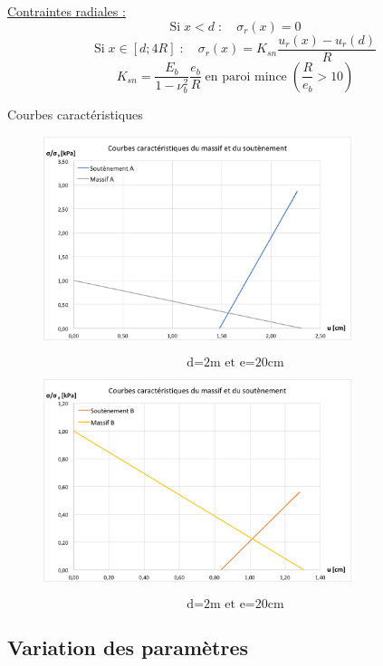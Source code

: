 \documentclass{beamer}
\begin{document}
\begin{frame}
\underline{Contraintes radiales :}\\
\[\text{Si}\;x<d\;:\quad \sigma_r(x)=0\]
\[\text{Si}\;x\in[d;4R]\;:\quad \sigma_r(x)=K_{sn}\dfrac{u_r(x)-u_r(d)}{R}\]
\[K_{sn}=\dfrac{E_b}{1-\nu_b^2}\dfrac{e_b}{R}\;\text{en paroi mince}\;\left(\dfrac{R}{e_b}>10\right)\]
    
    
\end{frame}

\begin{frame}{Courbes caractéristiques}
    
\begin{figure}
\centering
\includegraphics[width=9cm]{sig_u_A.png}
\end{figure}
\[\text{d=2m et e=20cm}\]
\end{frame}


\begin{frame}

\begin{figure}
\centering
\includegraphics[width=9cm]{sig_u_B.png}
\end{figure}
\[\text{d=2m et e=20cm}\]

\end{frame}

\subsection{Variation des paramètres}
\end{document}
